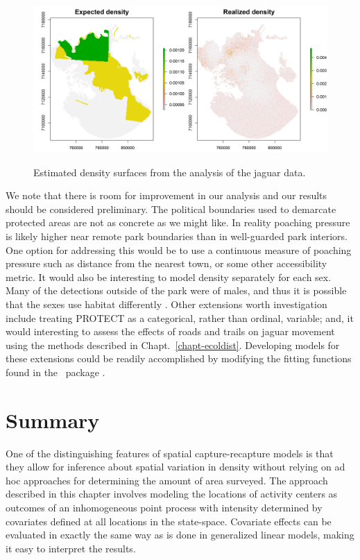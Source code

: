 \begin{figure}%
\centering
\includegraphics[width=\textwidth]{Ch11/figs/reD}
\label{state-space.fig.Dsurface}
\caption{Estimated density surfaces from the analysis of the jaguar data.}
\end{figure}

We note that there is room for improvement in our analysis and our
results should be considered preliminary. The
political boundaries used to demarcate protected areas are not as
concrete as we might like. In reality poaching pressure is likely
higher near remote park boundaries than in well-guarded park
interiors. One option for addressing this would be to use a continuous
measure of poaching pressure such as distance from the nearest town,
or some other accessibility metric. It would also be interesting to
model density separately for each sex. Many of the detections outside
of the park were of males, and thus it is possible that the sexes use
habitat differently \citep{conde_etal:2010}. Other extensions worth
investigation include treating PROTECT as a categorical, rather than
ordinal, variable; and, it would interesting to assess the effects of
roads and trails on jaguar movement using the methods described in
Chapt.~\ref{chapt-ecoldist}. Developing models for these extensions
could be readily accomplished by modifying the fitting functions found
in the \R~package \scrbook.



\section{Summary}

One of the distinguishing features of spatial capture-recapture models
is that they allow for inference about spatial variation
in density without relying on ad hoc approaches for determining the
amount of area surveyed. The approach described
in this chapter involves modeling the locations of activity centers as outcomes
of an inhomogeneous point process with intensity determined by
covariates defined at all locations in the state-space. Covariate
effects can be evaluated in exactly the same way as is done in
generalized linear models, making it easy to interpret the results.

